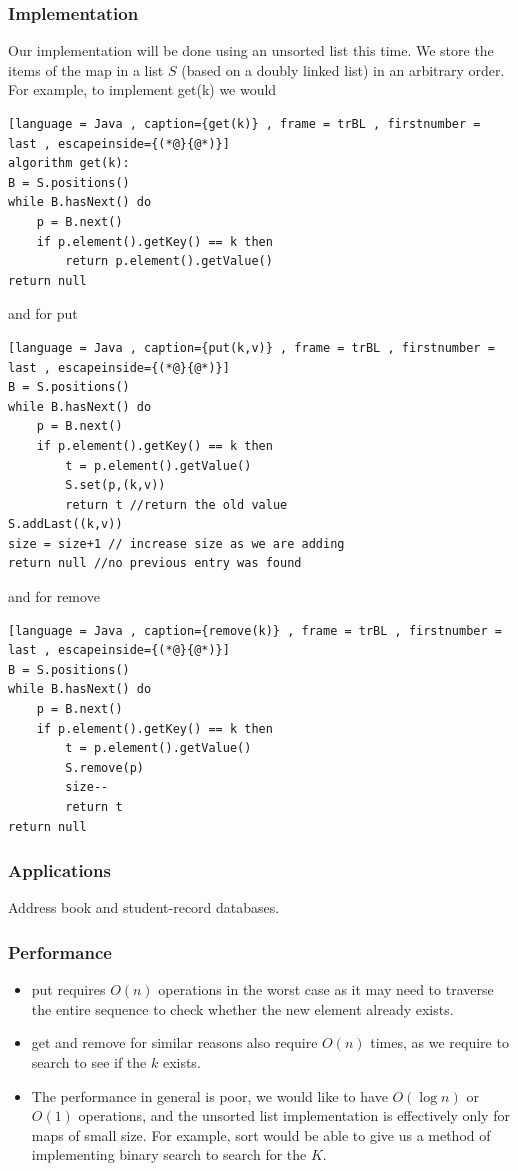 \documentclass[a4paper]{article}
\theoremstyle{plain}
\theoremstyle{definition}
\theoremstyle{remark}
\begin{document}
\subsubsection{Implementation}
Our implementation will be done using an unsorted list this time. We store the items of the map in a list $S$ (based on a doubly linked list) in an arbitrary order. For example, to implement get(k) we would
\begin{lstlisting}[language = Java , caption={get(k)} , frame = trBL , firstnumber = last , escapeinside={(*@}{@*)}]
algorithm get(k):
B = S.positions()
while B.hasNext() do
	p = B.next()
	if p.element().getKey() == k then
		return p.element().getValue()
return null
\end{lstlisting}
and for put
\begin{lstlisting}[language = Java , caption={put(k,v)} , frame = trBL , firstnumber = last , escapeinside={(*@}{@*)}]
B = S.positions()
while B.hasNext() do
	p = B.next()
	if p.element().getKey() == k then
		t = p.element().getValue()
		S.set(p,(k,v))
		return t //return the old value
S.addLast((k,v))
size = size+1 // increase size as we are adding
return null //no previous entry was found
\end{lstlisting}
and for remove
\begin{lstlisting}[language = Java , caption={remove(k)} , frame = trBL , firstnumber = last , escapeinside={(*@}{@*)}]
B = S.positions()
while B.hasNext() do
	p = B.next()
	if p.element().getKey() == k then
		t = p.element().getValue()
		S.remove(p)
		size--
		return t
return null
\end{lstlisting}
\subsubsection{Applications}
Address book and student-record databases.
\subsubsection{Performance}
\begin{itemize}
	\item put requires $O(n)$ operations in the worst case as it may need to traverse the entire sequence to check whether the new element already exists. 
	\item get and remove for similar reasons also require $O(n)$ times, as we require to search to see if the $k$ exists.
	\item The performance in general is poor, we would like to have $O(\log n)$ or $O(1)$ operations, and the unsorted list implementation is effectively only for maps of small size. For example, sort would be able to give us a method of implementing binary search to search for the $K$.
\end{itemize}
\end{document}
